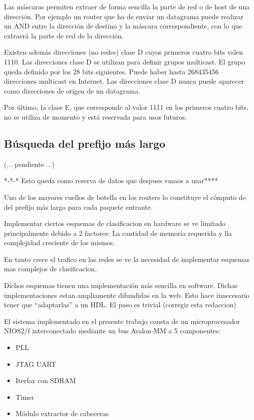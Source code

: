 Las máscaras permiten extraer de forma sencilla la parte de red o de host de una dirección. Por ejemplo un router que ha de enviar un datagrama puede realizar un AND entre la dirección de destino y la máscara correspondiente, con lo que extraerá la parte de red de la dirección.

Existen además direcciones (no redes) clase D cuyos primeros cuatro bits valen 1110. Las direcciones clase D se utilizan para definir grupos multicast. El grupo queda definido por los 28 bits siguientes. Puede haber hasta 268435456 direcciones multicast en Internet. Las direcciones clase D nunca puede aparecer como direcciones de origen de un datagrama.

Por último, la clase E, que corresponde al valor 1111 en los primeros cuatro bits, no se utiliza de
momento y está reservada para usos futuros.



\subsection{Búsqueda del prefijo más largo}

(... pendiente ...)


*-*-* Esto queda como reserva de datos que despues vmaos a usar****

Uno de los mayores cuellos de botella en los routers lo constituye el cómputo de del prefijo más largo para cada paquete entrante.

Implementar ciertos esquemas de clasificacion en hardware se ve limitado principalmente debido a 2 factores: La cantidad de memoria requerida y lla complejidad creciente de los mismos.

En tanto crece el trafico en las redes se ve la necesidad de implementar esquemas mas complejos de clasificacion.

Dichos esquemas tienen una implementación más sencilla en software. Dichas implementaciones estan ampliamente difundidas en la web.
Esto hace innecesario tener que “adaptarlas” a un HDL. El paso es trivial (corregir esta redaccion)



El sistema implementado en el presente trabajo consta de un microprocesador NIOS2/f interconectado mediante un bus Avalon-MM a 5 componentes: 
\begin{itemize}
\item PLL
\item JTAG UART
\item Iterfaz con SDRAM
\item Timer
\item Módulo extractor de cabeceras
\end{itemize}


